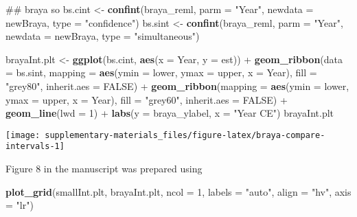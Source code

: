 \documentclass[12pt,]{article}
\newenvironment{Shaded}{\begin{snugshade}}{\end{snugshade}}
\newcommand{\KeywordTok}[1]{\textcolor[rgb]{0.13,0.29,0.53}{\textbf{{#1}}}}
\newcommand{\DataTypeTok}[1]{\textcolor[rgb]{0.13,0.29,0.53}{{#1}}}
\newcommand{\DecValTok}[1]{\textcolor[rgb]{0.00,0.00,0.81}{{#1}}}
\newcommand{\StringTok}[1]{\textcolor[rgb]{0.31,0.60,0.02}{{#1}}}
\newcommand{\OtherTok}[1]{\textcolor[rgb]{0.56,0.35,0.01}{{#1}}}
\newcommand{\NormalTok}[1]{{#1}}
\begin{document}
\begin{Shaded}
\begin{Highlighting}[]
\NormalTok{## braya so}
\NormalTok{bs.cint <-}\StringTok{ }\KeywordTok{confint}\NormalTok{(braya_reml, }\DataTypeTok{parm =} \StringTok{"Year"}\NormalTok{, }\DataTypeTok{newdata =} \NormalTok{newBraya,}
                   \DataTypeTok{type =} \StringTok{"confidence"}\NormalTok{)}
\NormalTok{bs.sint <-}\StringTok{ }\KeywordTok{confint}\NormalTok{(braya_reml, }\DataTypeTok{parm =} \StringTok{"Year"}\NormalTok{, }\DataTypeTok{newdata =} \NormalTok{newBraya,}
                   \DataTypeTok{type =} \StringTok{"simultaneous"}\NormalTok{)}

\NormalTok{brayaInt.plt <-}\StringTok{ }\KeywordTok{ggplot}\NormalTok{(bs.cint, }\KeywordTok{aes}\NormalTok{(}\DataTypeTok{x =} \NormalTok{Year, }\DataTypeTok{y =} \NormalTok{est)) +}
\StringTok{    }\KeywordTok{geom_ribbon}\NormalTok{(}\DataTypeTok{data =} \NormalTok{bs.sint,}
                \DataTypeTok{mapping =} \KeywordTok{aes}\NormalTok{(}\DataTypeTok{ymin =} \NormalTok{lower, }\DataTypeTok{ymax =} \NormalTok{upper, }\DataTypeTok{x =} \NormalTok{Year),}
                \DataTypeTok{fill =} \StringTok{"grey80"}\NormalTok{, }\DataTypeTok{inherit.aes =} \OtherTok{FALSE}\NormalTok{) +}
\StringTok{    }\KeywordTok{geom_ribbon}\NormalTok{(}\DataTypeTok{mapping =} \KeywordTok{aes}\NormalTok{(}\DataTypeTok{ymin =} \NormalTok{lower, }\DataTypeTok{ymax =} \NormalTok{upper, }\DataTypeTok{x =} \NormalTok{Year),}
                \DataTypeTok{fill =} \StringTok{"grey60"}\NormalTok{, }\DataTypeTok{inherit.aes =} \OtherTok{FALSE}\NormalTok{) +}
\StringTok{    }\KeywordTok{geom_line}\NormalTok{(}\DataTypeTok{lwd =} \DecValTok{1}\NormalTok{) +}
\StringTok{    }\KeywordTok{labs}\NormalTok{(}\DataTypeTok{y =} \NormalTok{braya_ylabel, }\DataTypeTok{x =} \StringTok{"Year CE"}\NormalTok{)}
\NormalTok{brayaInt.plt}
\end{Highlighting}
\end{Shaded}

\begin{center}\texttt{[image: supplementary-materials\_files/figure-latex/braya-compare-intervals-1]} \end{center}

Figure 8 in the manuscript was prepared using

\begin{Shaded}
\begin{Highlighting}[]
\KeywordTok{plot_grid}\NormalTok{(smallInt.plt, brayaInt.plt, }\DataTypeTok{ncol =} \DecValTok{1}\NormalTok{, }\DataTypeTok{labels =} \StringTok{"auto"}\NormalTok{,}
          \DataTypeTok{align =} \StringTok{"hv"}\NormalTok{, }\DataTypeTok{axis =} \StringTok{"lr"}\NormalTok{)}
\end{Highlighting}
\end{Shaded}
\end{document}
